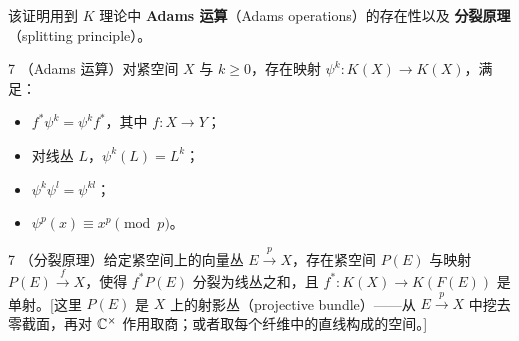 
该证明用到 $K$ 理论中 \textbf{Adams 运算}（Adams operations）的存在性以及 \textbf{分裂原理}（splitting principle）。

\begin{defn}{7}
  （Adams 运算）对紧空间 $X$ 与 $k\ge 0$，存在映射 $\psi^k:K(X)\to K(X)$，满足：
  \begin{itemize}[leftmargin=1.6em,itemsep=2pt]
    \item $f^*\psi^k=\psi^kf^*$，其中 $f:X\to Y$；
    \item 对线丛 $L$，$\psi^k(L)=L^k$；
    \item $\psi^k\psi^l=\psi^{kl}$；
    \item $\psi^p(x)\equiv x^p\pmod p$。
  \end{itemize}
\end{defn}

\begin{thm}{7}
  （分裂原理）给定紧空间上的向量丛 $E\xrightarrow{p}X$，存在紧空间 $P(E)$ 与映射 $P(E)\xrightarrow{f}X$，使得 $f^*P(E)$ 分裂为线丛之和，且 $f^*:K(X)\to K(F(E))$ 是单射。[这里 $P(E)$ 是 $X$ 上的射影丛（projective bundle）——从 $E\xrightarrow{p}X$ 中挖去零截面，再对 $\mathbb{C}^\times$ 作用取商；或者取每个纤维中的直线构成的空间。]
\end{thm}

